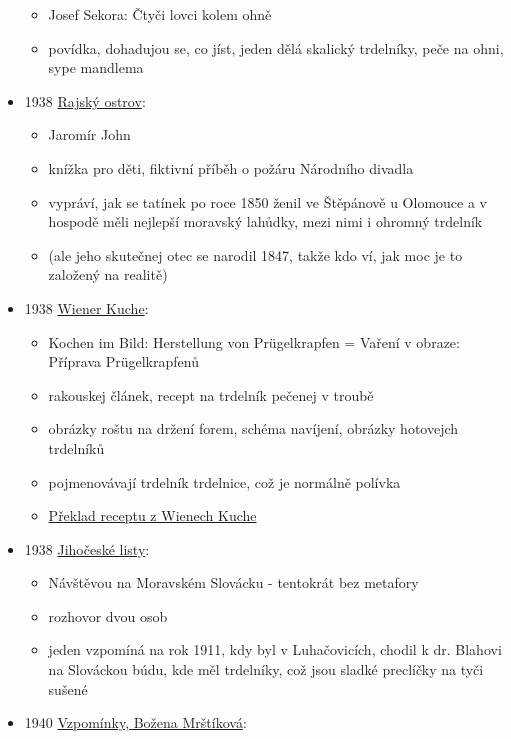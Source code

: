 \begin{itemize}
  \begin{itemize}
  \tightlist
  \item
    Josef Sekora: Čtyči lovci kolem ohně
  \item
    povídka, dohadujou se, co jíst, jeden dělá skalický trdelníky, peče
    na ohni, sype mandlema
  \end{itemize}
\item
  1938
  \href{https://ndk.cz/view/uuid:001e82b0-302a-11e9-b81e-005056827e52?page=uuid\%3A3123a720-50df-11e9-8854-005056827e51&fulltext=trdeln\%C3\%ADk}{Rajský
  ostrov}:

  \begin{itemize}
  \tightlist
  \item
    Jaromír John
  \item
    knížka pro děti, fiktivní příběh o požáru Národního divadla
  \item
    vypráví, jak se tatínek po roce 1850 ženil ve Štěpánově u Olomouce a
    v hospodě měli nejlepší moravský lahůdky, mezi nimi i ohromný
    trdelník
  \item
    (ale jeho skutečnej otec se narodil 1847, takže kdo ví, jak moc je
    to založený na realitě)
  \end{itemize}
\item
  1938
  \href{https://web.archive.org/web/20201230125915/http://kurtos.eu/dl/11664.pdf}{Wiener
  Kuche}:

  \begin{itemize}
  \tightlist
  \item
    Kochen im Bild: Herstellung von Prügelkrapfen = Vaření v obraze:
    Příprava Prügelkrapfenů
  \item
    rakouskej článek, recept na trdelník pečenej v troubě
  \item
    obrázky roštu na držení forem, schéma navíjení, obrázky hotovejch
    trdelníků
  \item
    pojmenovávají trdelník trdelnice, což je normálně polívka
  \item
    \hyperref[250615-0047]{Překlad receptu z Wienech Kuche}
  \end{itemize}
\item
  1938
  \href{https://ceskadigitalniknihovna.cz/uuid/uuid:e6636d2b-f486-4e2f-b5ae-fb4e89b772e4}{Jihočeské
  listy}:

  \begin{itemize}
  \tightlist
  \item
    Návštěvou na Moravském Slovácku - tentokrát bez metafory
  \item
    rozhovor dvou osob
  \item
    jeden vzpomíná na rok 1911, kdy byl v Luhačovicích, chodil k dr.
    Blahovi na Slováckou búdu, kde měl trdelníky, což jsou sladké
    preclíčky na tyči sušené
  \end{itemize}
\item
  1940
  \href{https://ndk.cz/view/uuid:911977c0-052e-11e8-816d-5ef3fc9bb22f?page=uuid\%3Aa0797b50-0cb5-11e8-8ee4-005056825209}{Vzpomínky,
  Božena Mrštíková}:


\end{itemize}
